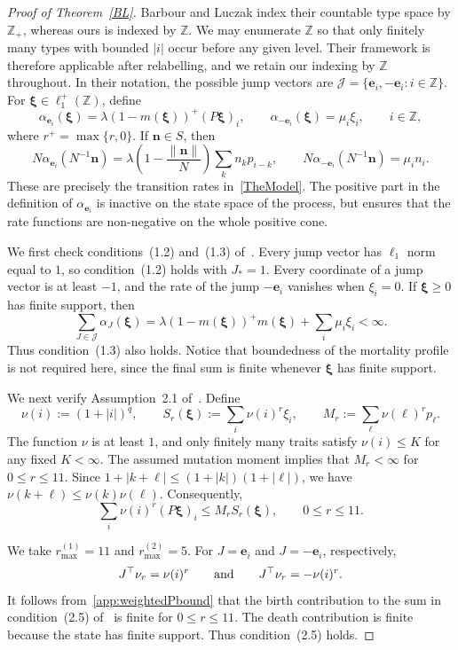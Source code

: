 \documentclass[12pt]{article}
\newcommand{\J}{\ensuremath{\mathcal{J}}}
\newcommand{\bn}{\boldsymbol{n}}
\newcommand{\be}{\boldsymbol{e}}
\newcommand{\bxi}{\boldsymbol{\xi}}
\begin{document}
\medskip
\begin{proof}[Proof of Theorem~\ref{BL}]
Barbour and Luczak index their countable type space by $\mathbb Z_+$,
whereas ours is indexed by $\mathbb Z$. We may enumerate $\mathbb Z$
so that only finitely many types with bounded $|i|$ occur before any
given level. Their framework is therefore applicable after relabelling,
and we retain our indexing by $\mathbb Z$ throughout.
In their notation, the possible jump vectors are
$\J=\{\be_i,-\be_i:i\in\mathbb Z\}$.
For $\bxi\in\ell_1^+(\mathbb Z)$, define
\[
 \alpha_{\be_i}(\bxi)
 =
 \lambda(1-m(\bxi))^+(P\bxi)_i,
 \qquad
 \alpha_{-\be_i}(\bxi)=\mu_i\xi_i,
 \qquad i\in\mathbb Z,
\]
where $r^+=\max\{r,0\}$. If $\bn\in S$, then
$$
 N\alpha_{\be_i}(N^{-1}\bn)
 = \lambda\left(1-\frac{\|\bn\|}{N}\right) \sum_k n_kp_{i-k},
\qquad
 N\alpha_{-\be_i}(N^{-1}\bn) = \mu_i n_i.
$$
These are precisely the transition rates in~\eqref{TheModel}. The
positive part in the definition of $\alpha_{\be_i}$ is inactive on the
state space of the process, but ensures that the rate functions are
non-negative on the whole positive cone.

We first check conditions~(1.2) and~(1.3) of~\cite{BL12b}. Every jump
vector has $\ell_1$ norm equal to $1$, so condition~(1.2) holds with $J_*=1$.
Every coordinate of a jump vector is at least $-1$, and the rate of the
jump $-\be_i$ vanishes when $\xi_i=0$. If $\bxi\geq0$ has finite
support, then
\[
 \sum_{J\in\J}\alpha_J(\bxi)
 =
 \lambda(1-m(\bxi))^+m(\bxi)
 +
 \sum_i\mu_i\xi_i
 <\infty.
\]
Thus condition~(1.3) also holds. Notice that boundedness of the
mortality profile is not required here, since the final sum is finite
whenever $\bxi$ has finite support.

We next verify Assumption~2.1 of~\cite{BL12b}. Define
\[
 \nu(i):=(1+|i|)^q,\qquad
 S_r(\bxi):=\sum_i\nu(i)^r\xi_i,\qquad
 M_r:=\sum_\ell\nu(\ell)^rp_\ell.
\]
The function $\nu$ is at least $1$, and only finitely many traits satisfy
$\nu(i)\leq K$ for any fixed $K<\infty$. The assumed mutation moment
implies that $M_r<\infty$ for $0\leq r\leq11$.
Since $1+|k+\ell| \leq (1+|k|)(1+|\ell|)$,
we have $\nu(k+\ell)\leq\nu(k)\nu(\ell)$. Consequently,
\begin{equation}
 \sum_i\nu(i)^r(P\bxi)_i
 \leq
 M_rS_r(\bxi),
 \qquad 0\leq r\leq11.
 \label{app:weightedPbound}
\end{equation}

We take $r_{\max}^{(1)}=11$ and $r_{\max}^{(2)}=5$. For
$J=\be_i$ and $J=-\be_i$, respectively,
\[
 J^\top\nu_r=\nu(i)^r
 \qquad\hbox{and}\qquad
 J^\top\nu_r=-\nu(i)^r.
\]
It follows from~\eqref{app:weightedPbound} that the birth contribution
to the sum in condition~(2.5) of~\cite{BL12b} is finite for
$0\leq r\leq11$. The death contribution is finite because the state
has finite support. Thus condition~(2.5) holds.


\end{proof}
\end{document}
